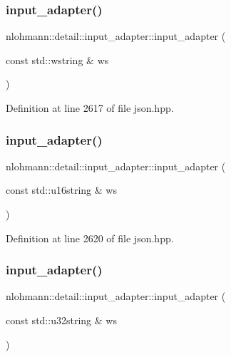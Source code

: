 \subsubsection{\texorpdfstring{input\_adapter()}{input\_adapter()}\hspace{0.1cm}{\footnotesize\ttfamily [4/11]}}
{\footnotesize\ttfamily nlohmann\+::detail\+::input\+\_\+adapter\+::input\+\_\+adapter (\begin{DoxyParamCaption}\item[{const std\+::wstring \&}]{ws }\end{DoxyParamCaption})\hspace{0.3cm}{\ttfamily [inline]}}



Definition at line 2617 of file json.\+hpp.

\mbox{\label{classnlohmann_1_1detail_1_1input__adapter_a58163eaa485b17dd878d3c782efc1e43}} 
\subsubsection{\texorpdfstring{input\_adapter()}{input\_adapter()}\hspace{0.1cm}{\footnotesize\ttfamily [5/11]}}
{\footnotesize\ttfamily nlohmann\+::detail\+::input\+\_\+adapter\+::input\+\_\+adapter (\begin{DoxyParamCaption}\item[{const std\+::u16string \&}]{ws }\end{DoxyParamCaption})\hspace{0.3cm}{\ttfamily [inline]}}



Definition at line 2620 of file json.\+hpp.

\mbox{\label{classnlohmann_1_1detail_1_1input__adapter_abe0015ae09e855f502620315b9dcc3db}} 
\subsubsection{\texorpdfstring{input\_adapter()}{input\_adapter()}\hspace{0.1cm}{\footnotesize\ttfamily [6/11]}}
{\footnotesize\ttfamily nlohmann\+::detail\+::input\+\_\+adapter\+::input\+\_\+adapter (\begin{DoxyParamCaption}\item[{const std\+::u32string \&}]{ws }\end{DoxyParamCaption})\hspace{0.3cm}{\ttfamily [inline]}}



